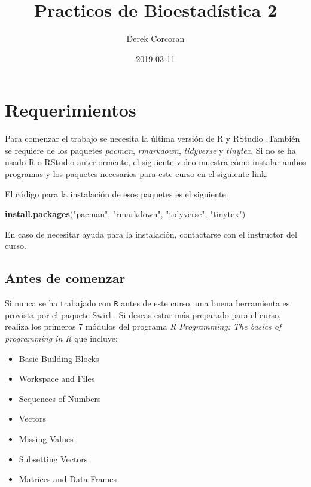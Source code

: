 \documentclass[]{book}
\title{Practicos de Bioestadística 2}
\author{Derek Corcoran}
\date{2019-03-11}
\newenvironment{Shaded}{\begin{snugshade}}{\end{snugshade}}
\newcommand{\KeywordTok}[1]{\textcolor[rgb]{0.13,0.29,0.53}{\textbf{#1}}}
\newcommand{\NormalTok}[1]{#1}
\newcommand{\StringTok}[1]{\textcolor[rgb]{0.31,0.60,0.02}{#1}}
\providecommand{\tightlist}{%
  \setlength{\itemsep}{0pt}\setlength{\parskip}{0pt}}
\begin{document}
\maketitle

{
\setcounter{tocdepth}{1}
\tableofcontents
}
\hypertarget{requerimientos}{%
\chapter*{Requerimientos}\label{requerimientos}}

Para comenzar el trabajo se necesita la última versión de R y RStudio \citep{R-base}.También se requiere de los paquetes \emph{pacman}, \emph{rmarkdown}, \emph{tidyverse} y \emph{tinytex}. Si no se ha usado R o RStudio anteriormente, el siguiente video muestra cómo instalar ambos programas y los paquetes necesarios para este curso en el siguiente \href{https://youtu.be/RtkCAKXsVbw}{link}.

El código para la instalación de esos paquetes es el siguiente:

\begin{Shaded}
\begin{Highlighting}[]
\KeywordTok{install.packages}\NormalTok{(}\StringTok{"pacman"}\NormalTok{, }\StringTok{"rmarkdown"}\NormalTok{, }\StringTok{"tidyverse"}\NormalTok{, }\StringTok{"tinytex"}\NormalTok{)}
\end{Highlighting}
\end{Shaded}

En caso de necesitar ayuda para la instalación, contactarse con el instructor del curso.

\hypertarget{antes-de-comenzar}{%
\section{Antes de comenzar}\label{antes-de-comenzar}}

Si nunca se ha trabajado con \texttt{R} antes de este curso, una buena herramienta es provista por el paquete \href{http://swirlstats.com/students.html}{Swirl} \citep{Kross2017}. Si deseas estar más preparado para el curso, realiza los primeros 7 módulos del programa \emph{R Programming: The basics of programming in R} que incluye:

\begin{itemize}
\tightlist
\item
  Basic Building Blocks
\item
  Workspace and Files
\item
  Sequences of Numbers
\item
  Vectors
\item
  Missing Values
\item
  Subsetting Vectors
\item
  Matrices and Data Frames
\end{itemize}
\end{document}
